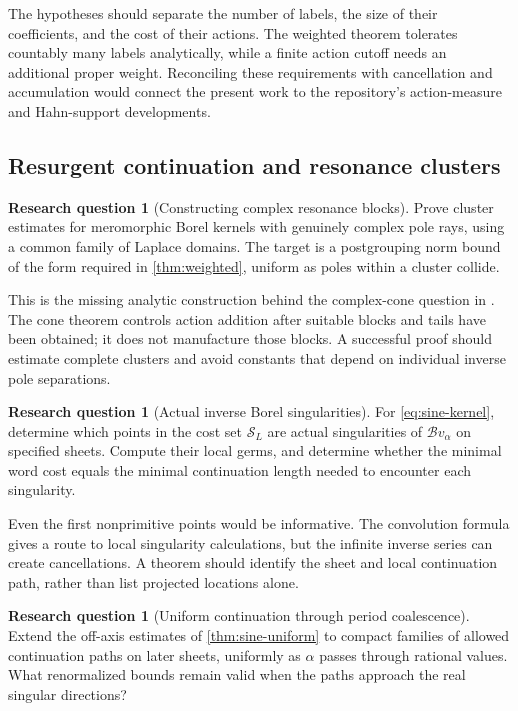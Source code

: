 \documentclass[11pt,a4paper]{article}
\numberwithin{equation}{section}
\theoremstyle{definition}
\newtheorem{question}[theorem]{Research question}
\theoremstyle{remark}
\newcommand{\B}{\mathcal B}
\newcommand{\sincost}{\mathcal S}
\begin{document}
The hypotheses should separate the number of labels, the size of
their coefficients, and the cost of their actions.
The weighted theorem tolerates countably many labels analytically,
while a finite action cutoff needs an additional proper weight.
Reconciling these requirements with cancellation and accumulation
would connect the present work to the repository's action-measure
and Hahn-support developments.

\subsection{Resurgent continuation and resonance clusters}

\begin{question}[Constructing complex resonance blocks]
Prove cluster estimates for meromorphic Borel kernels with genuinely
complex pole rays, using a common family of Laplace domains.
The target is a postgrouping norm bound of the form required in
\cref{thm:weighted}, uniform as poles within a cluster collide.
\end{question}

This is the missing analytic construction behind the complex-cone
question in \cite{repo-resonance}. The cone theorem controls action
addition after suitable blocks and tails have been obtained; it
does not manufacture those blocks. A successful proof should
estimate complete clusters and avoid constants that depend on
individual inverse pole separations.

\begin{question}[Actual inverse Borel singularities]
For \eqref{eq:sine-kernel}, determine which points in the cost set
$\sincost_L$ are actual singularities of $\B v_\alpha$ on specified
sheets. Compute their local germs, and determine whether the
minimal word cost equals the minimal continuation length needed
to encounter each singularity.
\end{question}

Even the first nonprimitive points would be informative.
The convolution formula gives a route to local singularity
calculations, but the infinite inverse series can create
cancellations. A theorem should identify the sheet and local
continuation path, rather than list projected locations alone.

\begin{question}[Uniform continuation through period coalescence]
Extend the off-axis estimates of \cref{thm:sine-uniform} to compact
families of allowed continuation paths on later sheets, uniformly
as $\alpha$ passes through rational values.
What renormalized bounds remain valid when the paths approach
the real singular directions?
\end{question}
\end{document}

